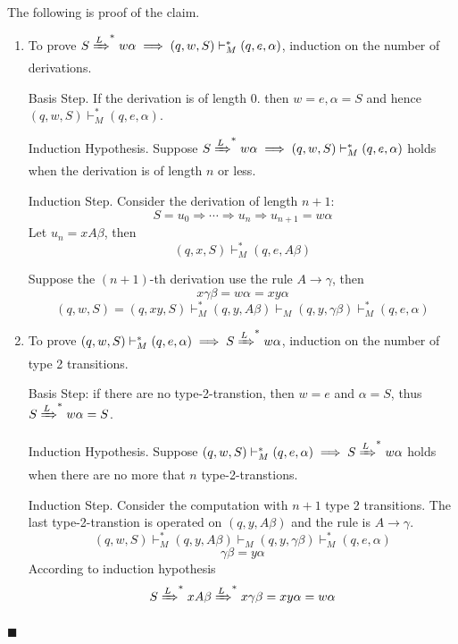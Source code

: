 \documentclass[aps,pra,onecolumn,notitlepage,superscriptaddress]{revtex4-1}
\def\y{\vdash}
\def\ys{\vdash^*}
\def\qed{$\blacksquare$ \newline}
\begin{document}
    The following is proof of the claim.
    \begin{enumerate}
        \item To prove $S \xRightarrow{L}^* w\alpha \implies (q,w,S) \ys_M (q,e,\alpha)$, induction on the number of derivations.
        
        Basis Step. If the derivation is of length 0. then $w = e, \alpha = S$ and hence $(q,w,S) \ys_M (q,e,\alpha)$.
        
        Induction Hypothesis. Suppose $S \xRightarrow{L}^* w\alpha \implies (q,w,S) \ys_M (q,e,\alpha)$ holds when the derivation is of length $n$ or less.

        Induction Step. Consider the derivation of length $n+1$:
        \begin{equation}
            S = u_0 \Rightarrow \cdots \Rightarrow u_n \Rightarrow u_{n+1} = w\alpha
        \end{equation} 
        Let $u_n = xA\beta$, then
        \begin{equation}
            (q,x,S) \ys_M (q, e, A\beta)
        \end{equation}

        Suppose the $(n+1)$-th derivation use the rule $A \to \gamma$, then
        \begin{equation}
            x\gamma\beta = w\alpha = xy\alpha
        \end{equation}
        \begin{equation}
            (q,w,S) = (q,xy,S) \ys_M (q,y,A\beta) \y_M (q,y,\gamma\beta) \y_M^* (q,e,\alpha)
        \end{equation}

        \item To prove $(q,w,S) \ys_M (q,e,\alpha) \implies S \xRightarrow{L}^* w\alpha$, induction on the number of type 2 transitions.
        
        Basis Step: if there are no type-2-transtion, then $w = e$ and $\alpha = S$, thus $S \xRightarrow{L}^* w\alpha = S$.

        Induction Hypothesis. Suppose $(q,w,S) \ys_M (q,e,\alpha) \implies S \xRightarrow{L}^* w\alpha$ holds when there are no more that $n$ type-2-transtions.

        Induction Step. Consider the computation with $n+1$ type 2 transitions. The last type-2-transtion is operated on $(q, y, A\beta)$ and the rule is $A \to \gamma$. 
        \begin{equation}
            (q,w,S) \ys_M (q,y,A\beta) \y_M (q,y,\gamma\beta) \ys_M (q,e,\alpha)
        \end{equation}
        \begin{equation}
            \gamma\beta = y\alpha
        \end{equation}
        According to induction hypothesis
        \begin{equation}
            S \xRightarrow{L}^* xA\beta \xRightarrow{L}^* x\gamma\beta = xy\alpha = w\alpha
        \end{equation}
    \end{enumerate}
    \qed
\end{document}
